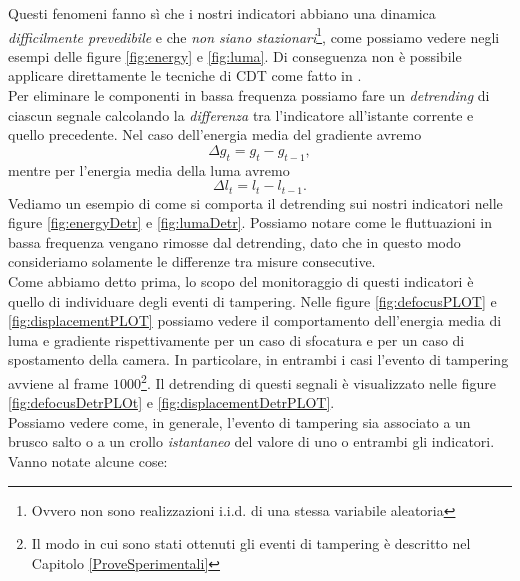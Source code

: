 Questi fenomeni fanno s\`i che i nostri indicatori abbiano una dinamica \textit{difficilmente prevedibile} e che \textit{non siano stazionari}\footnote{Ovvero non sono realizzazioni i.i.d. di una stessa variabile aleatoria}, come possiamo vedere negli esempi delle figure \ref{fig:energy} e \ref{fig:luma}.
Di conseguenza non \`e possibile applicare direttamente le tecniche di CDT come fatto in \cite{alippi2010detecting}. \\
Per eliminare le componenti in bassa frequenza possiamo fare un \textit{detrending} di ciascun segnale calcolando la \textit{differenza} tra l'indicatore all'istante corrente e quello precedente.
Nel caso dell'energia media del gradiente avremo
\begin{equation}
\label{eq:gradientDetr}
\Delta g_t = g_t - g_{t-1},
\end{equation}
mentre per l'energia media della luma avremo
\begin{equation}
\label{eq:lumaDetr}
\Delta l_t = l_t - l_{t -1}.
\end{equation}
Vediamo un esempio di come si comporta il detrending sui nostri indicatori nelle figure \ref{fig:energyDetr} e \ref{fig:lumaDetr}.  
Possiamo notare come le fluttuazioni in bassa frequenza vengano rimosse dal detrending, dato che in questo modo consideriamo solamente le differenze tra misure consecutive.\\
Come abbiamo detto prima, lo scopo del monitoraggio di questi indicatori \`e quello di individuare degli eventi di tampering.
Nelle figure \ref{fig:defocusPLOT} e \ref{fig:displacementPLOT} possiamo vedere il comportamento dell'energia media di luma e gradiente rispettivamente per un caso di sfocatura e per un caso di spostamento della camera.  
In particolare, in entrambi i casi l'evento di tampering avviene al frame $1000$\footnote{Il modo in cui sono stati ottenuti gli eventi di tampering \`e descritto nel Capitolo \ref{ProveSperimentali}}.
Il detrending di questi segnali \`e visualizzato nelle figure \ref{fig:defocusDetrPLOt} e \ref{fig:displacementDetrPLOT}.\\
\noindent Possiamo vedere come, in generale, l'evento di tampering sia associato a un brusco salto o a un crollo \textit{istantaneo} del valore di uno o entrambi gli indicatori.
Vanno notate alcune cose:
